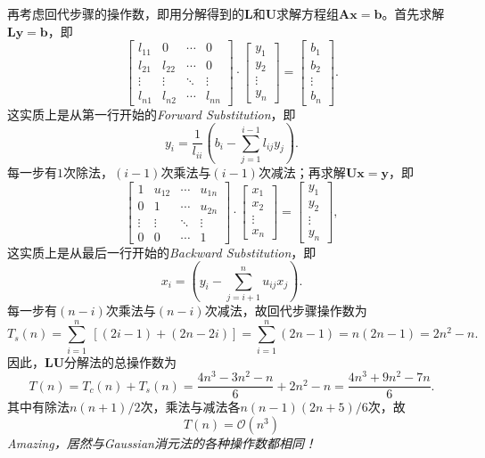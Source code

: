 再考虑回代步骤的操作数，即用分解得到的$\bm{L}$和$\bm{U}$求解方程组$\bm{Ax} = \bm{b}$。首先求解$\bm{Ly} = \bm{b}$，即
\[
    \begin{bmatrix}
        l_{11} & 0      & \cdots & 0      \\
        l_{21} & l_{22} & \cdots & 0      \\
        \vdots & \vdots & \ddots & \vdots \\
        l_{n1} & l_{n2} & \cdots & l_{nn}
    \end{bmatrix}
    \cdot
    \begin{bmatrix}
        y_1 \\ y_2 \\ \vdots \\ y_n
    \end{bmatrix}
    =
    \begin{bmatrix}
        b_1 \\ b_2 \\ \vdots \\ b_n
    \end{bmatrix}.
\]
这实质上是从第一行开始的\textit{Forward Substitution}，即
\[
    y_i=\frac{1}{l_{i i}}\left(b_i-\sum_{j=1}^{i-1} l_{i j} y_j\right).
\]
每一步有$1$次除法，$(i-1)$次乘法与$(i-1)$次减法；再求解$\bm{Ux} = \bm{y}$，即
\[
    \begin{bmatrix}
        1      & u_{12} & \cdots & u_{1n} \\
        0      & 1      & \cdots & u_{2n} \\
        \vdots & \vdots & \ddots & \vdots \\
        0      & 0      & \cdots & 1
    \end{bmatrix}
    \cdot
    \begin{bmatrix}
        x_1 \\ x_2 \\ \vdots \\ x_n
    \end{bmatrix}
    =
    \begin{bmatrix}
        y_1 \\ y_2 \\ \vdots \\ y_n
    \end{bmatrix},
\]
这实质上是从最后一行开始的\textit{Backward Substitution}，即
\[
    x_i=\left(y_i-\sum_{j=i+1}^{n} u_{i j} x_j\right).
\]
每一步有$(n-i)$次乘法与$(n-i)$次减法，故回代步骤操作数为
\[
    T_s(n)=\sum_{i=1}^{n} \ [(2i-1)+(2n-2i)] = \sum_{i=1}^{n} (2n-1) = n(2n-1) = 2n^2 -n.
\]
因此，$\bm{LU}$分解法的总操作数为
\[
    T(n)=T_c(n)+T_s(n)=\frac{4n^3 -3n^2 -n}{6} + 2n^2 -n = \frac{4n^3 +9n^2 -7n}{6}.
\]
其中有除法$n(n+1)/2$次，乘法与减法各$n(n-1)(2n+5)/6$次，故
\[
    \boxed{T(n) = \mathcal{O}(n^3)}
\]
\textit{Amazing，居然与Gaussian消元法的各种操作数都相同！}